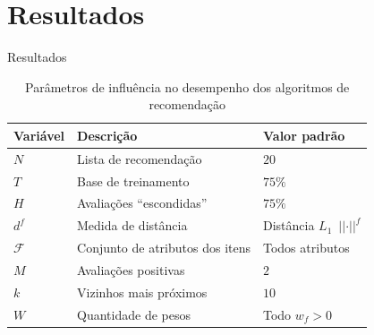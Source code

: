 \section[Resultados]{Resultados}

\begin{frame}{Resultados}
\begin{table}[hp]
\begin{center}
    \caption{Parâmetros de influência no desempenho dos algoritmos de recomendação}\vspace{-.5cm}
    \label{tab:variaveis}
    \begin{tabular}{  | p{1.5cm} | p{5.5cm} | p{3.0cm} | } 
    \hline
    \textbf{Variável} & \textbf{Descrição} & \textbf{Valor padrão}  \\ \hline
    $N$ & Lista de recomendação & $20$ \\ \hline   
    $T$ & Base de treinamento & $75\%$ \\ \hline
    $H$ & Avaliações ``escondidas'' & $75\%$ \\ \hline
    $d^f$ & Medida de distância & Distância $L_1$~$\left|\left|\cdot\right|\right|^f$ \\ \hline
    $\mathcal{F}$ & Conjunto de atributos dos itens & Todos atributos \\ \hline
    $M$ & Avaliações positivas & $2$ \\ \hline
    $k$ & Vizinhos mais próximos & $10$ \\ \hline
    $W$ & Quantidade de pesos & Todo $w_f>0$ \\ \hline
    \end{tabular}
\end{center}
\end{table}
\end{frame}

